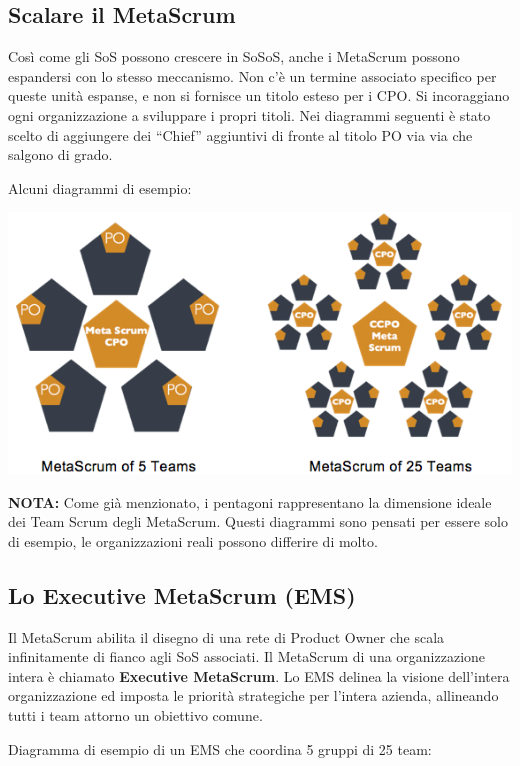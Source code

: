 \documentclass[12pt,a4paper,parskip=full]{scrartcl}
\begin{document}
\subsection{Scalare il MetaScrum}
Così come gli SoS possono crescere in SoSoS, anche i MetaScrum possono espandersi con lo stesso meccanismo. Non c'è un termine associato specifico per queste unità espanse, e non si fornisce un titolo esteso per i CPO. Si incoraggiano ogni organizzazione a sviluppare i propri titoli. Nei diagrammi seguenti è stato scelto di aggiungere dei ``Chief'' aggiuntivi di fronte al titolo PO via via che salgono di grado.

Alcuni diagrammi di esempio:

\includegraphics[width=1.0\linewidth]{MetaScrum-R2.png}

\textbf{NOTA:} Come già menzionato, i pentagoni rappresentano la dimensione ideale dei Team Scrum degli MetaScrum. Questi diagrammi sono pensati per essere solo di esempio, le organizzazioni reali possono differire di molto.

\subsection{Lo Executive MetaScrum (EMS)}
Il MetaScrum abilita il disegno di una rete di Product Owner che scala infinitamente di fianco agli SoS associati. Il MetaScrum di una organizzazione intera è chiamato \textbf{Executive MetaScrum}. Lo EMS delinea la visione dell'intera organizzazione ed imposta le priorità strategiche per l'intera azienda, allineando tutti i team attorno un obiettivo comune.

Diagramma di esempio di un EMS che coordina 5 gruppi di 25 team:
\end{document}
